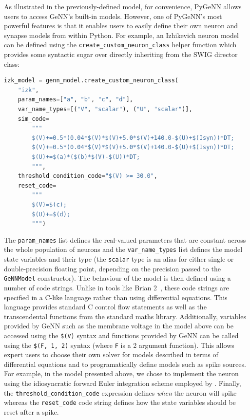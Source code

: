\documentclass[utf8]{frontiersSCNS} %
\begin{document}
As illustrated in the previously-defined model, for convenience, PyGeNN allows users to access GeNN's built-in models.
However, one of PyGeNN's most powerful features is that it enables users to easily define their own neuron and synapse models from within Python.
For example, an Izhikevich neuron model~\citep{Izhikevich2003a} can be defined using the \lstinline{create_custom_neuron_class} helper function which provides some syntactic sugar over directly inheriting from the SWIG director class:
%
\begin{lstlisting}[language=Python]
izk_model = genn_model.create_custom_neuron_class(
    "izk",
    param_names=["a", "b", "c", "d"],
    var_name_types=[("V", "scalar"), ("U", "scalar")],
    sim_code=
        """
        $(V)+=0.5*(0.04*$(V)*$(V)+5.0*$(V)+140.0-$(U)+$(Isyn))*DT;
        $(V)+=0.5*(0.04*$(V)*$(V)+5.0*$(V)+140.0-$(U)+$(Isyn))*DT;
        $(U)+=$(a)*($(b)*$(V)-$(U))*DT;
        """,
    threshold_condition_code="$(V) >= 30.0",
    reset_code=
        """
        $(V)=$(c);
        $(U)+=$(d);
        """)
\end{lstlisting}
%
The \lstinline{param_names} list defines the real-valued parameters that are constant across the whole population of neurons and the \lstinline{var_name_types} list defines the model state variables and their type (the \lstinline{scalar} type is an alias for either single or double-precision floating point, depending on the precision passed to the \lstinline{GeNNModel} constructor).
The behaviour of the model is then defined using a number of code strings.
Unlike in tools like Brian 2~\citep{Stimberg2019}, these code strings are specified in a C-like language rather than using differential equations.
This language provides standard C control flow statements as well as the transcendental functions from the standard maths library.
Additionally, variables provided by GeNN such as the membrane voltage in the model above can be accessed using the \lstinline{$(V)} syntax and functions provided by GeNN can be called using the \lstinline{$(F, 1, 2)} syntax (where \lstinline{F} is a 2 argument function).
This allows expert users to choose their own solver for models described in terms of differential equations and to programatically define models such as spike sources.
For example, in the model presented above, we chose to implement the neuron using the idiosyncratic forward Euler integration scheme employed by \citet{Izhikevich2003a}.
Finally, the \lstinline{threshold_condition_code} expression defines \emph{when} the neuron will spike whereas the \lstinline{reset_code} code string defines how the state variables should be reset after a spike.
\end{document}

